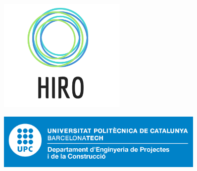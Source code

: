
\thispagestyle{CoverPage}


\begin{center}\bf

\begin{figure}[!tbp]
  \centering
  \begin{minipage}[b]{0.4\textwidth}
    \centering
      \includegraphics[width=0.55\textwidth]{./doc_config/images/logo.png}
  \end{minipage}
  \hfill
  \begin{minipage}[b]{0.5\textwidth}
    \centering
         \raisebox {0.5cm} {\includegraphics[width=0.9\textwidth]{./doc_config/images/UPC_dpt} }
  \end{minipage}
\end{figure}




\vspace{5cm}


\end{center}
